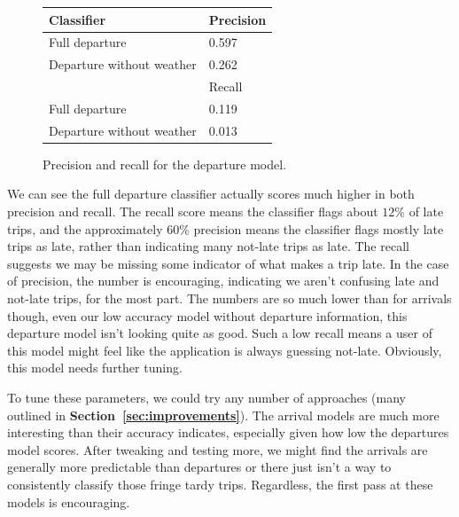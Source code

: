 \documentclass[11pt]{article} %
\begin{document}
\begin{figure}
    \begin{tabular}{l|l}
         Classifier & Precision\\
         \hline
         Full departure & 0.597\\
         Departure without weather & 0.262\\
         \hline
         & Recall\\
         \hline
         Full departure & 0.119\\
         Departure without weather & 0.013\\
    \end{tabular}
    \caption{Precision and recall for the departure model.}
    \label{fig:pr_departures}
\end{figure}

We can see the full departure classifier actually scores much higher in
both precision and recall. The recall score means the classifier flags about 
$12\%$ of late trips, and the approximately $60\%$ precision means the classifier
flags mostly late trips as late, rather than indicating many not-late trips
as late. The recall suggests we may be missing some indicator of what makes a 
trip late. In the case of precision, the number is encouraging, indicating we 
aren't confusing late and not-late trips, for the most part. The numbers are so
much lower than for arrivals though, even our low accuracy model without departure
information, this departure model isn't looking quite as good. Such a low 
recall means a user of this model might feel like the application is always 
guessing not-late. Obviously, this model needs further tuning.

To tune these parameters, we could try any number of approaches (many outlined in
\textbf{Section~\ref{sec:improvements}}). The arrival models are much more 
interesting than their accuracy indicates, especially given how low the 
departures model scores. After tweaking and testing more, we might find the
arrivals are generally more predictable than departures or there just isn't
a way to consistently classify those fringe tardy trips. Regardless, the first
pass at these models is encouraging.
\end{document}
